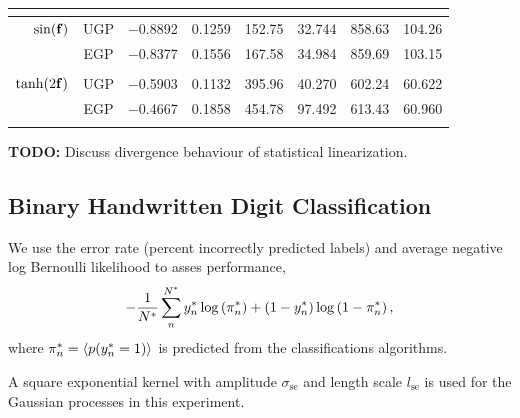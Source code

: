 \documentclass{article} %
\begin{document}
\begin{table}[htb]
\begin{tabular}{r|c| c c c c c c}
            & \cite{Opper2009} \\
        \midrule
        $\sin\!\left({\mathbf{f}}\right)$ 
            & UGP & $-$0.8892 & 0.1259 & 152.75 & 32.744 & 858.63
                & 104.26 \\
            & EGP & $-$0.8377 & 0.1556 & 167.58 & 34.984 & 859.69 & 103.15 \\
            & \cite{Opper2009} \\
        \midrule
        $\tanh\!\left({2\mathbf{f}}\right)$
            & UGP & $-$0.5903 & 0.1132 & 395.96 & 40.270 & 602.24 
                & 60.622 \\
            & EGP & $-$0.4667 & 0.1858 & 454.78 & 97.492 & 613.43 & 60.960 \\
            & \cite{Opper2009} \\
        \bottomrule
    \end{tabular}
\end{table}


\textbf{TODO:} Discuss divergence behaviour of statistical linearization.


\subsection{Binary Handwritten Digit Classification}

We use the error rate (percent incorrectly predicted labels) and average 
negative log Bernoulli likelihood to asses performance,
\begin{equation}
    - \frac{1}{N^{*}} \sum^{N^{*}}_{n} y^{*}_n 
        \log\left({\pi^{*}_n}\right)
    + \left({1-y^{*}_n}\right)\log\left({1 - \pi^{*}_n}\right),
\end{equation}
where $\pi^{*}_n = \left\langle{\ensuremath{p\!\left({y^{*}_n = 1}\right)}}\right\rangle_{}$ is predicted from the
classifications algorithms.

A square exponential kernel with amplitude $\sigma_\text{se}$ and length
scale $l_\text{se}$ is used for the Gaussian processes in this experiment.
\end{document}

